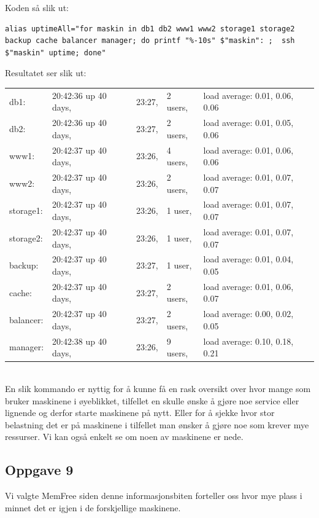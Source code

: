 \documentclass[a4paper, norsk, 12pt]{article}
\begin{document}
Koden så slik ut:
\begin{verbatim}
alias uptimeAll="for maskin in db1 db2 www1 www2 storage1 storage2 backup cache balancer manager; do printf "%-10s" $"maskin": ;  ssh $"maskin" uptime; done"
\end{verbatim}

Resultatet ser slik ut:\\
\begin{tabular}{lllll}
db1: & 20:42:36 up 40 days, & 23:27, & 2 users, & load average: 0.01, 0.06, 0.06\\
db2: & 20:42:36 up 40 days, & 23:27, & 2 users, & load average: 0.01, 0.05, 0.06\\
www1: & 20:42:37 up 40 days, & 23:26, & 4 users,& load average: 0.01, 0.06, 0.06\\
www2: & 20:42:37 up 40 days, & 23:26, & 2 users,& load average: 0.01, 0.07, 0.07\\
storage1: & 20:42:37 up 40 days, & 23:26, & 1 user, & load average: 0.01, 0.07, 0.07\\
storage2: & 20:42:37 up 40 days, & 23:26, & 1 user, & load average: 0.01, 0.07, 0.07\\
backup: & 20:42:37 up 40 days, & 23:27, & 1 user, & load average: 0.01, 0.04, 0.05\\
cache: & 20:42:37 up 40 days, & 23:27, & 2 users, & load average: 0.01, 0.06, 0.07\\
balancer: & 20:42:37 up 40 days, & 23:27, & 2 users, & load average: 0.00, 0.02, 0.05\\
manager: & 20:42:38 up 40 days, & 23:26, & 9 users, & load average: 0.10, 0.18, 0.21
\end{tabular}
\\

En slik kommando er nyttig for å kunne få en rask oversikt over hvor mange som bruker maskinene i øyeblikket, tilfellet en skulle ønske å gjøre noe service eller lignende og derfor starte maskinene på nytt. Eller for å sjekke hvor stor belastning det er på maskinene i tilfellet man ønsker å gjøre noe som krever mye ressurser. Vi kan også enkelt se om noen av maskinene er nede.

\subsection{Oppgave 9}
Vi valgte MemFree siden denne informasjonsbiten forteller oss hvor mye plass i minnet det er igjen i de forskjellige maskinene. \\
\end{document}
